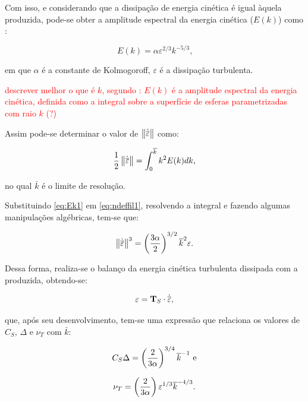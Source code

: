 \documentclass[_ArquivoPrincipal.tex]{subfiles}
\begin{document}
Com isso, e considerando que a dissipação de energia cinética é igual àquela produzida, pode-se obter a amplitude espectral da energia cinética ($E(k)$) como \cite{hughes2000large}:

\begin{equation}
    E(k)=\alpha\varepsilon^{2/3}k^{-5/3}\text{,}\label{eq:Ek1}
\end{equation}

\noindent em que $\alpha$ é a constante de Kolmogoroff, $\varepsilon$ é a dissipação turbulenta.

\textcolor{red}{descrever melhor o que é $k$, segundo : $E(k)$ é a amplitude espectral da energia cinética, definida como a integral sobre a superfície de esferas parametrizadas com raio $k$ (?)}

Assim pode-se determinar o valor de $\left\lVert{\dot{\overline{\mathbf{\varepsilon}}}}\right\lVert$ como:

\begin{equation}
    \frac{1}{2}\left\lVert{\dot{\overline{\mathbf{\varepsilon}}}}\right\lVert=\int_0^{\overline{k}}{k^2E(k)dk}\text{,}\label{eq:ndeffil1}
\end{equation}

\noindent no qual $\bar{k}$ é o limite de resolução.

Substituindo \ref{eq:Ek1} em \ref{eq:ndeffil1}, resolvendo a integral e fazendo algumas manipulações algébricas, tem-se que:

\begin{equation}
    \left\lVert{\dot{\overline{\mathbf{\varepsilon}}}}\right\lVert^3=\left({\frac{3\alpha}{2}}\right)^{3/2}\overline{k}^2\varepsilon\text{.}
\end{equation}

Dessa forma, realiza-se o balanço da energia cinética turbulenta dissipada com a produzida, obtendo-se:

\begin{equation}
    \varepsilon=\mathbf{T}_S\cdot\dot{\overline{\mathbf{\varepsilon}}}\text{,}
\end{equation}

\noindent que, após seu desenvolvimento, tem-se uma expressão que relaciona os valores de $C_S$, $\Delta$ e $\nu_T$ com $\bar{k}$:

\begin{equation}
    C_S\Delta=\left({\frac{2}{3\alpha}}\right)^{3/4}\overline{k}^{-1}\text{ e}
\end{equation}

\begin{equation}
    \nu_T=\left({\frac{2}{3\alpha}}\right)\varepsilon^{1/3}\overline{k}^{-4/3}\text{.}
\end{equation}
\end{document}
